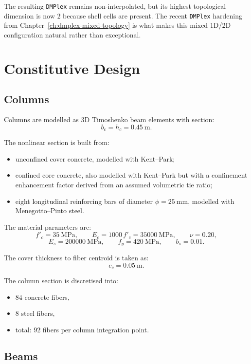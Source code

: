 The resulting \texttt{DMPlex} remains non-interpolated, but its highest
topological dimension is now \(2\) because shell cells are present.  The
recent \texttt{DMPlex} hardening from Chapter~\ref{ch:dmplex-mixed-topology}
is what makes this mixed 1D/2D configuration natural rather than exceptional.

\section{Constitutive Design}

\subsection{Columns}

Columns are modelled as 3D Timoshenko beam elements with section:
\[
b_c = h_c = 0.45\ \mathrm{m}.
\]

The nonlinear section is built from:
\begin{itemize}
  \item unconfined cover concrete, modelled with Kent--Park;
  \item confined core concrete, also modelled with Kent--Park but with a
        confinement enhancement factor derived from an assumed volumetric tie
        ratio;
  \item eight longitudinal reinforcing bars of diameter
        \(\phi = 25\ \mathrm{mm}\), modelled with Menegotto--Pinto steel.
\end{itemize}

The material parameters are:
\[
f'_c = 35\ \mathrm{MPa},
\qquad
E_c = 1000\,f'_c = 35000\ \mathrm{MPa},
\qquad
\nu = 0.20,
\]
\[
E_s = 200000\ \mathrm{MPa},
\qquad
f_y = 420\ \mathrm{MPa},
\qquad
b_s = 0.01.
\]

The cover thickness to fiber centroid is taken as:
\[
c_c = 0.05\ \mathrm{m}.
\]

The column section is discretised into:
\begin{itemize}
  \item \(84\) concrete fibers,
  \item \(8\) steel fibers,
  \item total: \(92\) fibers per column integration point.
\end{itemize}

\subsection{Beams}

